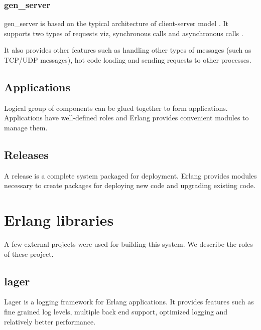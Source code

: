 \subsubsection{gen\_server}
\label{section:gen.server}

gen\_server is based on the typical architecture of client-server model
\citep{reliable.dist.sys}. It supports two types of requests viz, synchronous
calls%
and asynchronous calls%
.

It also provides other features such as handling other types of messages (such
as TCP/UDP messages), hot code loading and sending requests to other
processes.

\subsection{Applications}
\label{section:concepts.applications}
Logical group of components can be glued together to form applications.
Applications have well-defined roles and Erlang provides convenient modules to
manage them.

\subsection{Releases}
\label{section:concepts.releases}
A release is a complete system packaged for deployment. Erlang provides modules
necessary to create packages for deploying new code and upgrading existing code.

\section{Erlang libraries}

A few external projects were used for building this system. We describe the
roles of these project.

\subsection{lager}

Lager \citep{lager} is a logging framework for Erlang applications. It provides
features such as fine grained log levels, multiple back end support, optimized
logging and relatively better performance.

